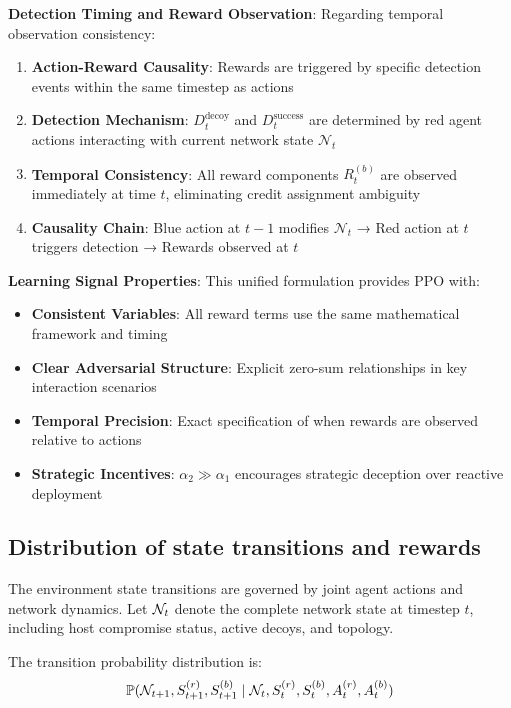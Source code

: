 \documentclass[12pt]{article}
\theoremstyle{definition}
\theoremstyle{plain}
\begin{document}
\textbf{Detection Timing and Reward Observation}:
Regarding temporal observation consistency:
\begin{enumerate}
\item \textbf{Action-Reward Causality}: Rewards are triggered by specific detection events within the same timestep as actions
\item \textbf{Detection Mechanism}: $D_t^{\text{decoy}}$ and $D_t^{\text{success}}$ are determined by red agent actions interacting with current network state $\mathcal{N}_t$
\item \textbf{Temporal Consistency}: All reward components $R_t^{(b)}$ are observed immediately at time $t$, eliminating credit assignment ambiguity
\item \textbf{Causality Chain}: Blue action at $t-1$ modifies $\mathcal{N}_t$ → Red action at $t$ triggers detection → Rewards observed at $t$
\end{enumerate}

\textbf{Learning Signal Properties}:
This unified formulation provides PPO with:
\begin{itemize}
\item \textbf{Consistent Variables}: All reward terms use the same mathematical framework and timing
\item \textbf{Clear Adversarial Structure}: Explicit zero-sum relationships in key interaction scenarios
\item \textbf{Temporal Precision}: Exact specification of when rewards are observed relative to actions
\item \textbf{Strategic Incentives}: $\alpha_2 \gg \alpha_1$ encourages strategic deception over reactive deployment
\end{itemize}

\subsection{Distribution of state transitions and rewards}

The environment state transitions are governed by joint agent actions and network dynamics. Let $\mathcal{N}_t$ denote the complete network state at timestep $t$, including host compromise status, active decoys, and topology.

The transition probability distribution is:
\begin{equation}
\mathbb{P}(\mathcal{N}_{t+1}, S_{t+1}^{(r)}, S_{t+1}^{(b)} \mid \mathcal{N}_t, S_t^{(r)}, S_t^{(b)}, A_t^{(r)}, A_t^{(b)})
\end{equation}
\end{document}
